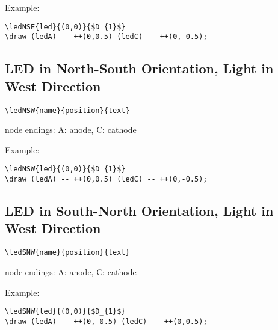 \documentclass[parskip=full]{scrartcl}
\begin{document}
Example:\\
\begin{minipage}{0.8\textwidth}
\begin{verbatim}
\ledNSE{led}{(0,0)}{$D_{1}$}
\draw (ledA) -- ++(0,0.5) (ledC) -- ++(0,-0.5);
\end{verbatim}
\end{minipage}
\begin{minipage}{0.19\textwidth}
\end{minipage}

\subsection{LED in North-South Orientation, Light in West Direction}

\begin{verbatim}
\ledNSW{name}{position}{text}
\end{verbatim}
node endings: A: anode, C: cathode

Example:\\
\begin{minipage}{0.8\textwidth}
\begin{verbatim}
\ledNSW{led}{(0,0)}{$D_{1}$}
\draw (ledA) -- ++(0,0.5) (ledC) -- ++(0,-0.5);
\end{verbatim}
\end{minipage}
\begin{minipage}{0.19\textwidth}
\end{minipage}

\subsection{LED in South-North Orientation, Light in West Direction}

\begin{verbatim}
\ledSNW{name}{position}{text}
\end{verbatim}
node endings: A: anode, C: cathode

Example:\\
\begin{minipage}{0.8\textwidth}
\begin{verbatim}
\ledSNW{led}{(0,0)}{$D_{1}$}
\draw (ledA) -- ++(0,-0.5) (ledC) -- ++(0,0.5);
\end{verbatim}
\end{minipage}
\begin{minipage}{0.19\textwidth}
\end{minipage}
\end{document}
